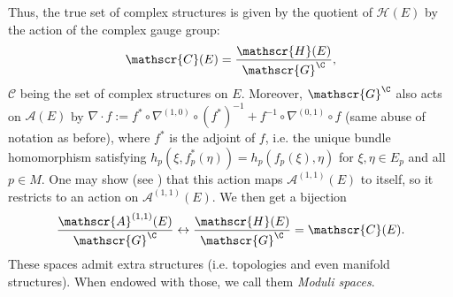 Thus, the true set of complex structures is given by the quotient of \(\mathscr{H}(E)\) by the action of the complex gauge group:
\[
\mathscr{C}(E)=\frac{\mathscr{H}(E)}{\mathscr{G}^\C},
\]
\(\mathscr{C}\) being the set of complex structures on \(E\). Moreover, \(\mathscr{G}^\C\) also acts on \(\mathscr{A}(E)\) by \(\nabla \cdot f:=f^* \circ \nabla^{(1,0)} \circ (f^*)^{-1} + f^{-1} \circ \nabla^{(0,1)} \circ f\) (same abuse of notation as before), where \(f^*\) is the adjoint of \(f\), i.e. the unique bundle homomorphism satisfying \(h_p(\xi, f_p^*(\eta))=h_p(f_p(\xi), \eta)\) for \(\xi, \eta \in E_p\) and all \(p \in M\). One may show (see \parencite[Sec. 7.1]{kobayashi_complex_vector_bundles}) that this action maps \(\mathscr{A}^{(1,1)}(E)\) to itself, so it restricts to an action on \(\mathscr{A}^{(1,1)}(E)\). We then get a bijection 
\begin{equation} \label{eq_moduli_Chern_correspondence}
\frac{\mathscr{A}^{(1,1)}(E)}{\mathscr{G}^\C} \leftrightarrow \frac{\mathscr{H}(E)}{\mathscr{G}^\C} = \mathscr{C}(E).
\end{equation}
These spaces admit extra structures (i.e. topologies and even manifold structures). When endowed with those, we call them \textit{Moduli spaces}.